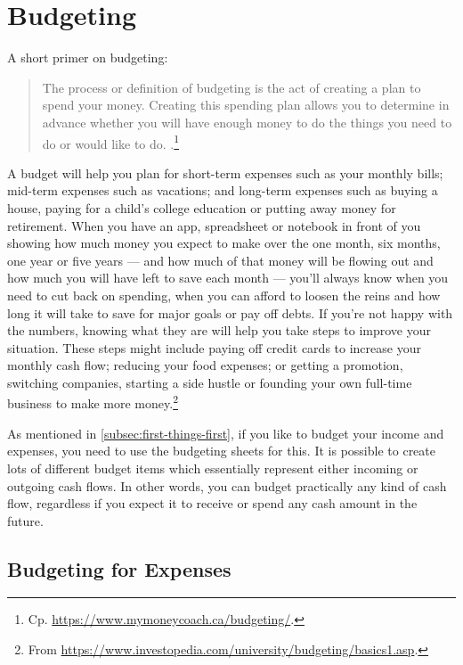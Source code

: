 \section{Budgeting}
\label{section:Budgeting}

A short primer on budgeting:
\begin{quote}\small
	The process or definition of budgeting is the act of creating a plan to spend your money.
	Creating this spending plan allows you to determine in advance whether you will have enough money to do the things you need to do or would like to do. .\footnote{Cp. \url{https://www.mymoneycoach.ca/budgeting/}.}
\end{quote}

A budget will help you plan for short-term expenses such as your monthly bills; mid-term expenses such as vacations; and long-term expenses such as buying a house, paying for a child’s college education or putting away money for retirement.
When you have an app, spreadsheet or notebook in front of you showing how much money you expect to make over the one month, six months, one year or five years — and how much of that money will be flowing out and how much you will have left to save each month — you’ll always know when you need to cut back on spending, when you can afford to loosen the reins and how long it will take to save for major goals or pay off debts.
If you’re not happy with the numbers, knowing what they are will help you take steps to improve your situation.
These steps might include paying off credit cards to increase your monthly cash flow; reducing your food expenses; or getting a promotion, switching companies, starting a side hustle or founding your own full-time business to make more money.\footnote{From \url{https://www.investopedia.com/university/budgeting/basics1.asp}.}

As mentioned in \autoref{subsec:first-things-first}, if you like to budget your income and expenses, you need to use the budgeting sheets for this.
It is possible to create lots of different budget items which essentially represent either incoming or outgoing cash flows.
In other words, you can budget practically any kind of cash flow, regardless if you expect it to receive or spend any cash amount in the future.

\subsection{Budgeting for Expenses}
\label{subsec:budgeting-expenses}


